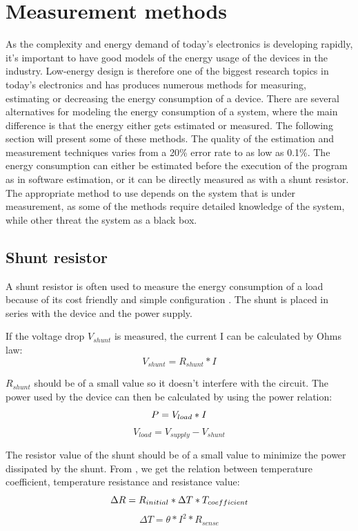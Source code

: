 \chapter{Measurement methods}
As the complexity and energy demand of today's electronics is developing rapidly, it's important to have good models of the energy usage of the devices in the industry. Low-energy design is therefore one of the biggest research topics in today's electronics and has produces numerous methods for measuring, estimating or decreasing the energy consumption of a device. There are several alternatives for modeling the energy consumption of a system, where the main difference is that the energy either gets estimated or measured. The following section will present some of these methods. The quality of the estimation and measurement techniques varies from a 20\% error rate to as low as 0.1\%.  The energy consumption can either be estimated before the execution of the program as in software estimation, or it can be directly measured as with a shunt resistor. The appropriate method to use depends on the system that is under measurement, as some of the methods require detailed knowledge of the system, while other threat the system as a black box.
\section{Shunt resistor}
A shunt resistor is often used to measure the energy consumption of a load because of its cost friendly and simple configuration \cite{Intersil} \cite{Infineon} \cite{Vishay}. The shunt is placed in series with the device and the power supply.

If the voltage drop $V_{shunt}$ is measured, the current I can be calculated by Ohms law:\begin{equation}
V_{shunt}=R_{shunt}*I
\end{equation}

$R_{shunt}$ should be of a small value so it doesn't interfere with the circuit. The power used by the device can then be calculated by using the power relation:
\begin{equation}
P=V_{load}*I \\
\end{equation}
\begin{equation}
V_{load}= V_{supply}-V_{shunt}
\end{equation}

 The resistor value of the shunt should be of a small value to minimize the power dissipated by the shunt. From \cite{Intersil}, we get the relation between temperature coefficient, temperature resistance and resistance value:
\begin{equation}
\Delta R= R_{initial}* \Delta T * T_{coefficient}\\
\label{rchange}
\end{equation}
\begin{equation}
 \Delta T = \theta * I^{2}*R_{sense}
\end{equation}

